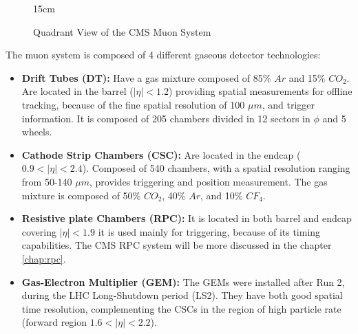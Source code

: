 \begin{figure}[!htm]{15cm} %
\caption{Quadrant View of the CMS Muon System}%
\label{fig:cms_muon}
\end{figure}

The muon system is composed of 4 different gaseous detector technologies:
\begin{itemize}
    \item \textbf{Drift Tubes (DT):} Have a gas mixture composed of 85\% $Ar$ and 15\% $CO_2$. Are located in the barrel ($|\eta| < 1.2$) providing spatial measurements for offline tracking, because of the fine spatial resolution of 100 $\mu m$, and trigger information. It is composed of 205 chambers divided in 12 sectors in $\phi$ and 5 wheels. 
    \item \textbf{Cathode Strip Chambers (CSC):} Are located in the endcap ($0.9 < |\eta| < 2.4$). Composed of 540 chambers, with a spatial resolution ranging from 50-140 $\mu m$, provides triggering and position measurement. The gas mixture is composed of 50\% $CO_2$, 40\% $Ar$, and 10\% $CF_4$. 
    \item \textbf{Resistive plate Chambers (RPC):} It is located in both barrel and endcap covering $|\eta| < 1.9$ it is used mainly for triggering, because of its timing capabilities. The CMS RPC system will be more discussed in the chapter \ref{chap:rpc}.
    \item \textbf{Gas-Electron Multiplier (GEM):} The GEMs were installed after Run 2, during the LHC Long-Shutdown period (LS2). They have both good spatial time resolution, complementing the CSCs in the region of high particle rate (forward region $ 1.6 < |\eta| < 2.2$).
\end{itemize}

